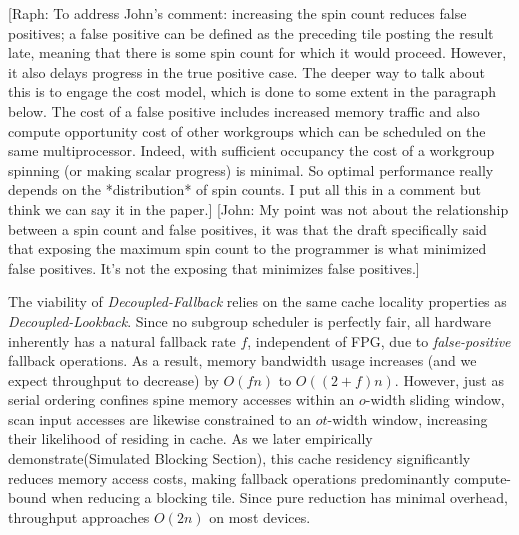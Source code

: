 \documentclass[sigconf]{acmart}
\newcommand{\john}[1]{{\footnotesize\color{cyan}[John: #1]}}
\newcommand{\raph}[1]{{\footnotesize\color{magenta}[Raph: #1]}}
\begin{document}
\raph{To address John's comment: increasing the spin count reduces false positives; a false positive can be defined as the preceding tile posting the result late, meaning that there is some spin count for which it would proceed. However, it also delays progress in the true positive case. The deeper way to talk about this is to engage the cost model, which is done to some extent in the paragraph below. The cost of a false positive includes increased memory traffic and also compute opportunity cost of other workgroups which can be scheduled on the same multiprocessor. Indeed, with sufficient occupancy the cost of a workgroup spinning (or making scalar progress) is minimal. So optimal performance really depends on the *distribution* of spin counts. I put all this in a comment but think we can say it in the paper.}
\john{My point was not about the relationship between a spin count and false positives, it was that the draft specifically said that exposing the maximum spin count to the programmer is what minimized false positives. It's not the exposing that minimizes false positives.}

The viability of \emph{Decoupled-Fallback} relies on the same cache locality properties as \emph{Decoupled-Lookback}. Since no subgroup scheduler is perfectly fair, all hardware inherently has a natural fallback rate $f$\!, independent of FPG, due to \emph{false-positive} fallback operations. As a result, memory bandwidth usage increases (and we expect throughput to decrease) by $O(fn)$ to $O((2 + f)n)$. However, just as serial ordering confines spine memory accesses within an $o$-width sliding window, scan input accesses are likewise constrained to an $ot$-width window, increasing their likelihood of residing in cache. As we later empirically demonstrate(Simulated Blocking Section), this cache residency significantly reduces memory access costs, making fallback operations predominantly compute-bound when reducing a blocking tile. Since pure reduction has minimal overhead, throughput approaches $O(2n)$ on most devices.
\end{document}

